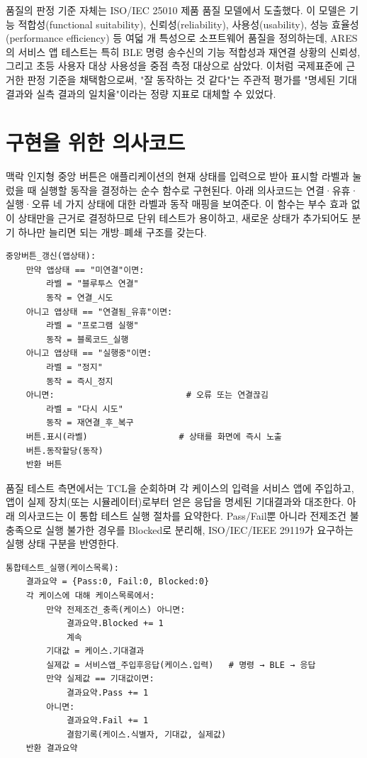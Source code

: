 품질의 판정 기준 자체는 ISO/IEC 25010 제품 품질 모델에서 도출했다. 이 모델은 기능 적합성(functional suitability), 신뢰성(reliability), 사용성(usability), 성능 효율성(performance efficiency) 등 여덟 개 특성으로 소프트웨어 품질을 정의하는데\cite{iso25010}, ARES의 서비스 앱 테스트는 특히 BLE 명령 송수신의 기능 적합성과 재연결 상황의 신뢰성, 그리고 초등 사용자 대상 사용성을 중점 측정 대상으로 삼았다. 이처럼 국제표준에 근거한 판정 기준을 채택함으로써, "잘 동작하는 것 같다"는 주관적 평가를 "명세된 기대결과와 실측 결과의 일치율"이라는 정량 지표로 대체할 수 있었다.

\section{구현을 위한 의사코드}

맥락 인지형 중앙 버튼은 애플리케이션의 현재 상태를 입력으로 받아 표시할 라벨과 눌렀을 때 실행할 동작을 결정하는 순수 함수로 구현된다. 아래 의사코드는 연결·유휴·실행·오류 네 가지 상태에 대한 라벨과 동작 매핑을 보여준다. 이 함수는 부수 효과 없이 상태만을 근거로 결정하므로 단위 테스트가 용이하고, 새로운 상태가 추가되어도 분기 하나만 늘리면 되는 개방–폐쇄 구조를 갖는다.

\begin{verbatim}
중앙버튼_갱신(앱상태):
    만약 앱상태 == "미연결"이면:
        라벨 = "블루투스 연결"
        동작 = 연결_시도
    아니고 앱상태 == "연결됨_유휴"이면:
        라벨 = "프로그램 실행"
        동작 = 블록코드_실행
    아니고 앱상태 == "실행중"이면:
        라벨 = "정지"
        동작 = 즉시_정지
    아니면:                          # 오류 또는 연결끊김
        라벨 = "다시 시도"
        동작 = 재연결_후_복구
    버튼.표시(라벨)                  # 상태를 화면에 즉시 노출
    버튼.동작할당(동작)
    반환 버튼
\end{verbatim}

품질 테스트 측면에서는 TCL을 순회하며 각 케이스의 입력을 서비스 앱에 주입하고, 앱이 실제 장치(또는 시뮬레이터)로부터 얻은 응답을 명세된 기대결과와 대조한다. 아래 의사코드는 이 통합 테스트 실행 절차를 요약한다. Pass/Fail뿐 아니라 전제조건 불충족으로 실행 불가한 경우를 Blocked로 분리해, ISO/IEC/IEEE 29119가 요구하는 실행 상태 구분을 반영한다.

\begin{verbatim}
통합테스트_실행(케이스목록):
    결과요약 = {Pass:0, Fail:0, Blocked:0}
    각 케이스에 대해 케이스목록에서:
        만약 전제조건_충족(케이스) 아니면:
            결과요약.Blocked += 1
            계속
        기대값 = 케이스.기대결과
        실제값 = 서비스앱_주입후응답(케이스.입력)   # 명령 → BLE → 응답
        만약 실제값 == 기대값이면:
            결과요약.Pass += 1
        아니면:
            결과요약.Fail += 1
            결함기록(케이스.식별자, 기대값, 실제값)
    반환 결과요약
\end{verbatim}

